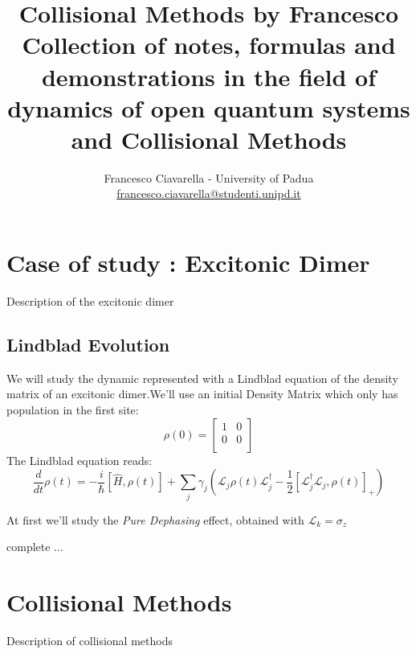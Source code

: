 \documentclass[a4paper,12pt]{article}
\title{
	\vspace{2cm}
	\Huge \textbf{Collisional Methods by Francesco} \\[0.5cm]
	\large Collection of notes, formulas and demonstrations in the field of dynamics of open quantum systems and Collisional Methods
	\vspace{5cm}
}
\author{\Large Francesco Ciavarella - University of Padua \\[10pt] \href{mailto:francesco.ciavarella@studenti.unipd.it}{francesco.ciavarella@studenti.unipd.it}}
\begin{document}
	
	\maketitle
	\thispagestyle{empty} 
	\newpage
	
	\tableofcontents
	\newpage
	
	\section{Case of study : Excitonic Dimer}
	Description of the excitonic dimer
	
	\subsection{Lindblad Evolution}
	We will study the dynamic represented with a Lindblad equation of the density matrix of an excitonic dimer.We'll use an initial Density Matrix which only has population in the first site: 
	\begin{equation}
		\rho (0)  = \begin{bmatrix}1 & 0 \\ 0 & 0 \\\end{bmatrix}
	\end{equation}
	The Lindblad equation reads:
	\begin{equation}
		\frac{d}{dt} \rho (t) = 	-\frac{i}{\hbar} \left[ \hat{H}, \rho (t) \right] + \sum_{j}{\gamma_j \left( \mathcal{L}_j \rho (t) \mathcal{L}_j^\dagger - \frac{1}{2} \left[ \mathcal{L}_j^\dagger \mathcal{L}_j, \rho (t) \right]_+ \right) }
	\end{equation}
	
	At first we'll study the \textit{Pure Dephasing} effect, obtained with $ \mathcal{L}_{k} = \sigma_{z} $
	
	complete ...
	\section{Collisional Methods}
	Description of collisional methods
	
\end{document}
